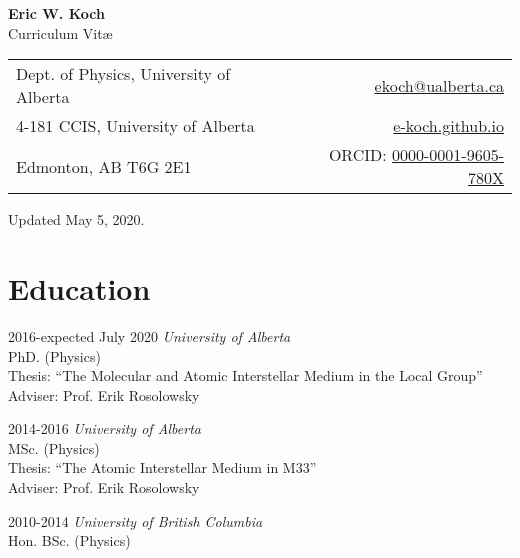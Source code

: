 \documentclass[letterpaper,11pt]{article}
\makeatletter
\newcommand{\myname}{Eric W. Koch}
\newcommand{\myaffil}{Dept. of Physics, University of Alberta}
\newcommand{\myemail}{ekoch@ualberta.ca}
\newcommand{\mypostlineone}{4-181 CCIS, University of Alberta}
\newcommand{\mypostlinetwo}{Edmonton, AB T6G 2E1}
\newcommand{\mysite}{e-koch.github.io}
\newcommand{\myorcid}{https://orcid.org/0000-0001-9605-780X}
\newlength{\mainindent} \setlength{\mainindent}{12pt}
\newlength{\contentindent} \setlength{\contentindent}{19ex}
\newenvironment{datelist}{
  \begingroup
  \raggedright
  \begin{description}[labelindent=\mainindent,leftmargin=\contentindent,
      style=sameline,font=\normalfont,topsep=0pt,partopsep=0pt,parsep=0pt,
      itemsep=4pt]
}{
  \end{description}
  \endgroup
}
\makeatother
\begin{document}
\pagestyle{fancy}
\lhead{} \chead{} \rhead{} \renewcommand{\headrule}{\relax}
\cfoot{\thepage/\pageref*{LastPage}}
\rfoot{\textsc{\myname}}

\begin{center}
\textbf{\Large \myname} \\
{\large Curriculum Vit\ae}
\end{center}

\medskip

\begin{tabular*}{\textwidth}{@{\extracolsep{\fill}}lr}
\myaffil &
 \textsf{\href{mailto:\myemail}{\myemail}} \\
\mypostlineone &
 \url{\mysite} \\
\mypostlinetwo &
  \textsf{ORCID: \href{\myorcid}{0000-0001-9605-780X}} \\
\end{tabular*}

\medskip


Updated %
May 5, 2020.

\section*{Education}
\begin{datelist}
\item[2016-expected July 2020]
  \emph{University of Alberta} \\
  PhD. (Physics) \\
  Thesis: {``The Molecular and Atomic Interstellar Medium in the Local Group''} \\
  Adviser: Prof. Erik Rosolowsky
\item[2014-2016]
  \emph{University of Alberta} \\
  MSc. (Physics) \\
  Thesis: {``The Atomic Interstellar Medium in M33''} \\
  Adviser: Prof. Erik Rosolowsky
\item[2010-2014]
  \emph{University of British Columbia} \\
  Hon. BSc. (Physics)
\end{datelist}
\end{document}
